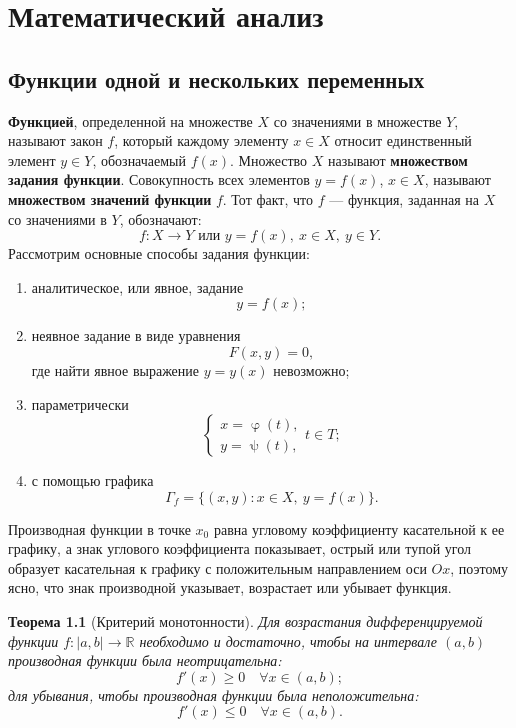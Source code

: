 \documentclass[a4paper, 12pt]{report}
\numberwithin{equation}{section}
\renewcommand{\leq}{\leqslant}
\renewcommand{\geq}{\geqslant}
\renewcommand{\varphi}{\upvarphi}
\renewcommand{\psi}{\uppsi}
\newtheorem*{theorem}{Теорема}
\begin{document}
	\tableofcontents{}
	\chapter{Математический анализ}
	\section{Функции одной и нескольких переменных}
	\textbf{Функцией}, определенной на множестве \( X \) со значениями в множестве \( Y \), называют закон \( f \), который каждому элементу \( x \in X \) относит единственный элемент \( y \in Y \), обозначаемый \( f(x) \). Множество \( X \) называют \textbf{множеством задания функции}. Совокупность всех элементов \( y=f(x) \), \( x \in X \), называют \textbf{множеством значений функции} \( f \). Тот факт, что \( f \) — функция, заданная на \( X \) со значениями в \( Y \), обозначают:
	\[
	f : X \to Y \text{ или } y = f(x), \ x \in X, \ y \in Y.
	\]
	Рассмотрим основные способы задания функции:
	\begin{enumerate}
		\item аналитическое, или явное, задание
		\begin{equation}
			y = f(x);
		\end{equation}
		\item неявное задание в виде уравнения
		\begin{equation}
			F(x,y) = 0,
		\end{equation}
		где найти явное выражение $y=y(x)$ невозможно;
		\item параметрически
		\begin{equation}
			\begin{cases}
				x = \varphi(t),\\
				y = \psi(t),
			\end{cases} t \in T;
		\end{equation}
		\item с помощью графика
		\begin{equation}
			\Gamma_f = \{(x,y) : x \in X,\ y = f(x)\}.
		\end{equation}
	\end{enumerate}
	Производная функции в точке \( x_0 \) равна угловому коэффициенту касательной к ее графику, а знак углового коэффициента показывает, острый или тупой угол образует касательная к графику с положительным направлением оси \( Ox \), поэтому ясно, что знак производной указывает, возрастает или убывает функция.
	\begin{theorem}
		[Критерий монотонности]
		Для возрастания дифференцируемой функции \( f : |a, b| \to \mathbb{R} \) необходимо и достаточно, чтобы на интервале \( (a, b) \) производная функции была неотрицательна:
		\[
		f'(x) \geq 0 \quad \forall x \in (a, b);
		\]
		для убывания, чтобы производная функции была неположительна:
		\[
		f'(x) \leq 0 \quad \forall x \in (a, b).
		\]
	\end{theorem}
\end{document}

